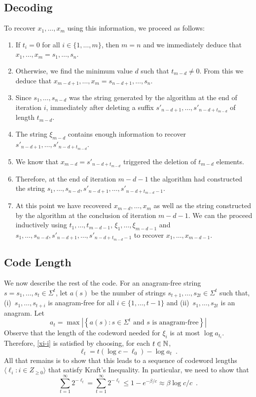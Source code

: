 \documentclass{patmorin}
\begin{document}
\subsection{Decoding}

To recover $x_1,\ldots,x_m$ using this information, we proceed as follows:
\begin{enumerate}
  \item If $t_i=0$ for all $i\in\{1,\ldots,m\}$, then $m=n$ and we immediately deduce that $x_1,\ldots,x_m=s_1,\ldots,s_n$.
  \item Otherwise, we find the minimum value $d$ such that $t_{m-d}\neq 0$.  
  From this we deduce that $x_{m-d+1},\ldots,x_m = s_{n-d+1},\ldots,s_n$.
  \item Since $s_1,\ldots,s_{n-d}$ was the string generated by the algorithm at the end of iteration $i$, immediately after deleting a suffix $s'_{n-d+1},\ldots,s'_{n-d+t_{m-d}}$ of length $t_{m-d}$.
  \item The string $\xi_{m-d}$ contains enough information to recover
  $s'_{n-d+1},\ldots,s'_{n-d+t_{m-d}}$.
  \item We know that $x_{m-d} = s'_{n-d+t_{m-d}}$ triggered the deletion of $t_{m-d}$ elements.
  \item Therefore, at the end of iteration $m-d-1$ the algorithm had constructed the string $s_1,\ldots,s_{n-d},s'_{n-d+1},\ldots,s'_{n-d+t_{m-d}-1}$.
  \item At this point we have recovered $x_{m-d},\ldots,x_m$ as well as the string constructed by the algorithm at the conclusion of iteration $m-d-1$.  We can the proceed inductively using $t_1,\ldots,t_{m-d-1}$, $\xi_1,\ldots,\xi_{m-d-1}$ and $s_1,\ldots,s_{n-d},s'_{n-d+1},\ldots,s'_{n-d+t_{m-d}-1}$ to recover $x_1,\ldots,x_{m-d-1}$.
\end{enumerate}

\subsection{Code Length}

We now describe the rest of the code.  For an anagram-free string $s=s_1,\ldots,s_t\in \Sigma^{t}$, let $a(s)$ be the number of strings $s_{t+1},\ldots,s_{2t}\in\Sigma^t$ such that, (i)~$s_1,\ldots,s_{t+i}$ is anagram-free for all $i\in\{1,\ldots,t-1\}$ and (ii)~$s_1,\ldots,s_{2t}$ is an anagram.  Let 
\[
   a_t = \max\left|\left\{a(s) : \text{$s\in \Sigma^t$ and $s$ is anagram-free} \right\}\right|
\]
Observe that the length of the codeword needed for $\xi_i$ is at most $\log a_{t_i}$.  Therefore, \eqref{xi-i} is satisfied by choosing, for each $t\in \mathbb{N}$,
\[
   \ell_t = t(\log c - \ell_0)- \log a_t   \enspace .
\]
All that remains is to show that this leads to a sequence of codeword lengths $\langle \ell_i : i\in Z_{\ge 0}\rangle$ that satisfy Kraft's Inequality.  In particular, we need to show that
\[
  \sum_{t=1}^\infty 2^{-\ell_t} = \sum_{t=1}^\infty 2^{-\ell_t} \le 1-e^{-\beta/c} \approx \beta\log c/c \enspace .
\]
\end{document}
